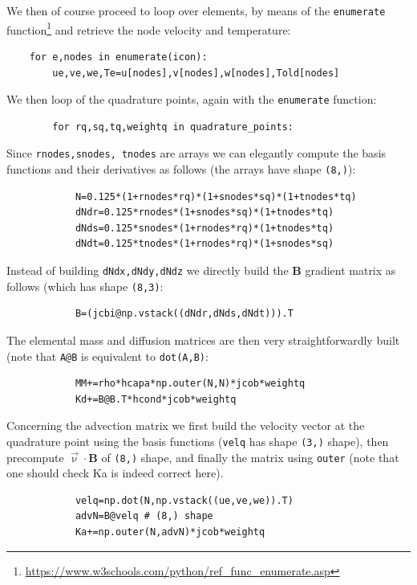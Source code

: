 We then of course proceed to loop over elements, 
by means of the \lstinline{enumerate} 
function\footnote{\url{https://www.w3schools.com/python/ref_func_enumerate.asp}}
and retrieve the node velocity and temperature:

\begin{lstlisting}
    for e,nodes in enumerate(icon):
        ue,ve,we,Te=u[nodes],v[nodes],w[nodes],Told[nodes]
\end{lstlisting}

We then loop of the quadrature points, again with the \lstinline{enumerate}
function:
\begin{lstlisting}
        for rq,sq,tq,weightq in quadrature_points:
\end{lstlisting}
Since \lstinline{rnodes,snodes, tnodes} are arrays we can 
elegantly compute the basis functions and their derivatives as follows
(the arrays have shape \lstinline{(8,)}):
\begin{lstlisting}
            N=0.125*(1+rnodes*rq)*(1+snodes*sq)*(1+tnodes*tq)
            dNdr=0.125*rnodes*(1+snodes*sq)*(1+tnodes*tq)
            dNds=0.125*snodes*(1+rnodes*rq)*(1+tnodes*tq)
            dNdt=0.125*tnodes*(1+rnodes*rq)*(1+snodes*sq)
\end{lstlisting}


Instead of building \lstinline{dNdx,dNdy,dNdz} we directly build the 
${\bm B}$ gradient matrix as follows (which has shape \lstinline{(8,3)}:
\begin{lstlisting}
            B=(jcbi@np.vstack((dNdr,dNds,dNdt))).T
\end{lstlisting}
The elemental mass and diffusion matrices are then very straightforwardly built
(note that \lstinline{A@B} is equivalent to \lstinline{dot(A,B)}:
\begin{lstlisting}
            MM+=rho*hcapa*np.outer(N,N)*jcob*weightq
            Kd+=B@B.T*hcond*jcob*weightq
\end{lstlisting}
Concerning the advection matrix we first build the 
velocity vector at the quadrature point using the 
basis functions (\lstinline{velq} has shape \lstinline{(3,)} shape),
then precompute $\vec\upnu \cdot {\bm B}$ of \lstinline{(8,)} shape,
and finally the matrix using \lstinline{outer} (note that 
one should check Ka is indeed correct here).

\begin{lstlisting}
            velq=np.dot(N,np.vstack((ue,ve,we)).T) 
            advN=B@velq # (8,) shape
            Ka+=np.outer(N,advN)*jcob*weightq
\end{lstlisting}

